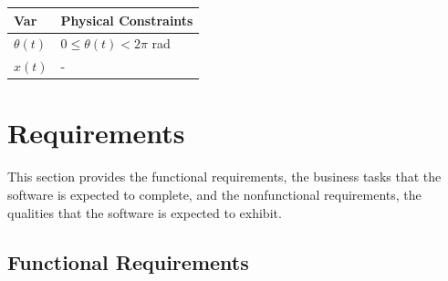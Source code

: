 \documentclass[12pt]{article}
\newcommand{\aref}[1]{A\ref{#1}}
\begin{document}
\begin{table}[!h]
\caption{Output Variables} \label{TblOutputVar}
\renewcommand{\arraystretch}{1.2}
\noindent \begin{longtable*}{l l} 
  \toprule
  \textbf{Var} & \textbf{Physical Constraints} \\
  \midrule 
  $\theta(t)$ &  $0\leq \theta(t) < 2\pi$   \si{\radian}\\
  $x(t)$      &  -
  \\
  \bottomrule
\end{longtable*}
\end{table}


\section{Requirements} \label{sec:reqs}


This section provides the functional requirements, the business tasks that the
software is expected to complete, and the nonfunctional requirements, the
qualities that the software is expected to exhibit.

\subsection{Functional Requirements}
\end{document}
